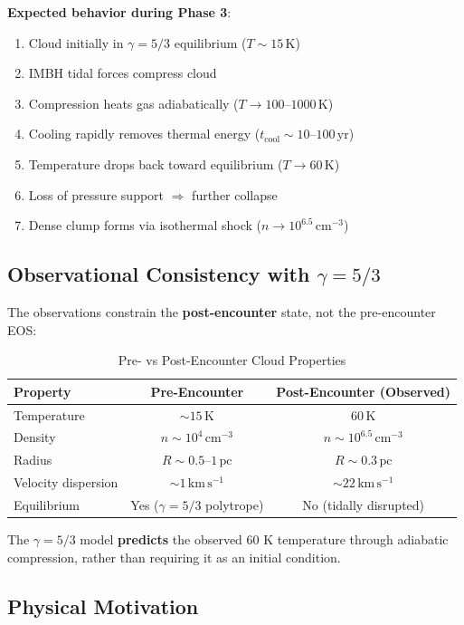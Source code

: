 \documentclass[11pt,a4paper]{article}
\newcommand{\kms}{\,\mathrm{km\,s^{-1}}}
\newcommand{\pc}{\,\mathrm{pc}}
\newcommand{\cmcubed}{\,\mathrm{cm^{-3}}}
\begin{document}
\textbf{Expected behavior during Phase 3}:
\begin{enumerate}
    \item Cloud initially in $\gamma = 5/3$ equilibrium ($T \sim 15\,\mathrm{K}$)
    \item IMBH tidal forces compress cloud
    \item Compression heats gas adiabatically ($T \to 100$--$1000\,\mathrm{K}$)
    \item Cooling rapidly removes thermal energy ($t_\mathrm{cool} \sim 10$--$100\,\mathrm{yr}$)
    \item Temperature drops back toward equilibrium ($T \to 60\,\mathrm{K}$)
    \item Loss of pressure support $\Rightarrow$ further collapse
    \item Dense clump forms via isothermal shock ($n \to 10^{6.5}\cmcubed$)
\end{enumerate}

\subsection{Observational Consistency with $\gamma = 5/3$}

The observations constrain the \textbf{post-encounter} state, not the pre-encounter EOS:

\begin{table}[h]
\centering
\caption{Pre- vs Post-Encounter Cloud Properties}
\begin{tabular}{lcc}
\toprule
\textbf{Property} & \textbf{Pre-Encounter} & \textbf{Post-Encounter (Observed)} \\
\midrule
Temperature & $\sim 15\,\mathrm{K}$ & $60\,\mathrm{K}$ \\
Density & $n \sim 10^4\cmcubed$ & $n \sim 10^{6.5}\cmcubed$ \\
Radius & $R \sim 0.5$--$1\pc$ & $R \sim 0.3\pc$ \\
Velocity dispersion & $\sim 1\kms$ & $\sim 22\kms$ \\
Equilibrium & Yes ($\gamma = 5/3$ polytrope) & No (tidally disrupted) \\
\bottomrule
\end{tabular}
\end{table}

The $\gamma = 5/3$ model \textbf{predicts} the observed 60 K temperature through
adiabatic compression, rather than requiring it as an initial condition.

\subsection{Physical Motivation}
\end{document}
